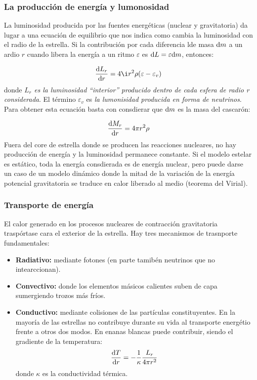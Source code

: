 \subsubsection{La producción de energía y lumonosidad}

La luminosidad producida por las fuentes energéticas (nuclear y gravitatoria) da lugar a una ecuación de equilibrio que nos indica como cambia la luminosidad con el radio de la estrella. Si la contribución por cada diferencia lde masa $\mathrm{d} m$ a un ardio $r$ cuando libera la energía a un ritmo $\varepsilon$ es $\mathrm{d} L = \varepsilon \mathrm{d} m$, entonces:

\begin{equation}
	\derivadas{L_r}{r} = 4 \i r^2 \rho (\varepsilon-\varepsilon_{{v}})
\end{equation}
donde \textit{$L_r$ es la luminosidad ``interior'' producido dentro de cada esfera de radio r considerada}. El término $\varepsilon_v$ es \textit{la lumonisidad producida en forma de neutrinos}. Para obtener esta ecuación basta con consdierar que $\mathrm{d} m$ es la masa del cascarón:

\begin{equation*}
	\frac{\mathrm{d} M_r}{\mathrm{d} r} = 4 \pi r^2 \rho
\end{equation*}
Fuera del core de estrella donde se producen las reacciones nucleares, no hay producción de energía y la luminosidad permanece constante. Si el modelo estelar es estático, toda la energía consdierada es de energía nuclear, pero puede darse un caso de un modelo dinámico donde la mitad de la variación de la energía potencial gravitatoria se traduce en calor liberado al medio (teorema del Virial).

\subsubsection{Transporte de energía}

El calor generado en los procesos nucleares de contracción gravitatoria traspórtase cara el exterior de la estrella. Hay tres mecanismos de trasnporte fundamentales:

\begin{itemize}
	\item \textbf{Radiativo:} mediante fotones (en parte tamibén neutrinos que no intearccionan).
	\item \textbf{Convectivo:} donde los elementos másicos calientes suben de capa sumergiendo trozos más fríos.
	\item \textbf{Conductivo:} mediante colisiones de las partículas constituyentes. En la mayoría de las estrellas no contribuye durante su vida al transporte energétio frente a otros dos modos. En enanas blancas puede contribuir, siendo el gradiente de la temperatura:
	      \begin{equation}
		      \frac{\mathrm{d} T}{\mathrm{d} r} = - \frac{1}{\kappa} \frac{L_r}{4\pi r^2}
	      \end{equation}
	      donde $\kappa$ es la conductividad térmica.
\end{itemize}

